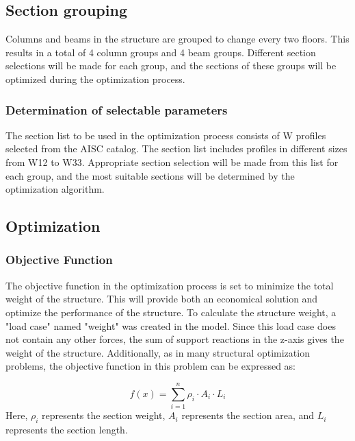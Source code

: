 \subsection{Section grouping}
Columns and beams in the structure are grouped to change every two floors. This results in a total of 4 column groups and 4 beam groups. Different section selections will be made for each group, and the sections of these groups will be optimized during the optimization process.

\subsubsection{Determination of selectable parameters}
The section list to be used in the optimization process consists of W profiles selected from the AISC catalog. The section list includes profiles in different sizes from W12 to W33. Appropriate section selection will be made from this list for each group, and the most suitable sections will be determined by the optimization algorithm.

\subsection{Optimization}

\subsubsection{Objective Function}
The objective function in the optimization process is set to minimize the total weight of the structure. This will provide both an economical solution and optimize the performance of the structure.
To calculate the structure weight, a "load case" named "weight" was created in the model. Since this load case does not contain any other forces, the sum of support reactions in the z-axis gives the weight of the structure. Additionally, as in many structural optimization problems, the objective function in this problem can be expressed as:

\begin{equation}
    f(x) = \sum_{i=1}^{n} \rho_i \cdot A_i \cdot L_i
\end{equation}
Here, $\rho_i$ represents the section weight, $A_i$ represents the section area, and $L_i$ represents the section length. 


